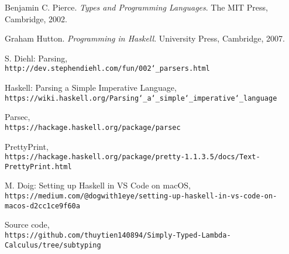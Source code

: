 \documentclass[fleqn, 11pt]{article}
\begin{document}
\begin{thebibliography}{9}
    Benjamin C. Pierce. 
    \textit{Types and Programming Languages}. 
    The MIT Press, Cambridge, 2002.
     
    Graham Hutton. 
    \textit{Programming in Haskell}. 
    University Press, Cambridge, 2007.
     
    S. Diehl:  Parsing,
    \\\texttt{http://dev.stephendiehl.com/fun/002\char`_parsers.html}

    Haskell: Parsing a Simple Imperative Language,
    \\\texttt{https://wiki.haskell.org/Parsing\char`_a\char`_simple\char`_imperative\char`_language}

    Parsec,
    \\\texttt{https://hackage.haskell.org/package/parsec}

    PrettyPrint,
    \\\texttt{https://hackage.haskell.org/package/pretty-1.1.3.5/docs/Text-PrettyPrint.html}

    M. Doig: Setting up Haskell in VS Code on macOS,
    \\\texttt{https://medium.com/@dogwith1eye/setting-up-haskell-in-vs-code-on-macos-d2cc1ce9f60a}

    Source code,
    \\\texttt{https://github.com/thuytien140894/Simply-Typed-Lambda-Calculus/tree/subtyping}
\end{thebibliography}
\end{document}
